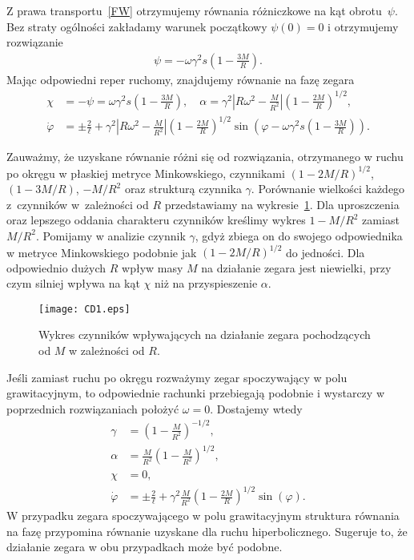 Z prawa transportu~\eqref{FW} otrzymujemy równania różniczkowe 
na kąt obrotu~$\psi$. Bez straty ogólności zakładamy warunek 
początkowy $\psi(0)=0$ i otrzymujemy rozwiązanie
\begin{align*}
\psi = - \omega \gamma^2 s \left( 1-\frac{3M}{R} \right).
\end{align*}
Mając odpowiedni reper ruchomy, znajdujemy równanie na 
fazę zegara
\begin{align}\nonumber
\chi &= - \psi =\omega \gamma^2 s \left( 1-\frac{3M}{R} \right)
 , \quad 
\alpha =  \gamma^2 
\left| R\omega^2 - \frac{M}{R^2} \right|
\left( 1-\frac{2M}{R} \right)^{1/2} ,
\\ \nonumber
\dot{\varphi} &= \pm \frac{2}{\ell} + 
\gamma^2 
\left| R\omega^2 - \frac{M}{R^2} \right|
\left( 1-\frac{2M}{R} \right)^{1/2}
\sin \left(\varphi - 
\omega \gamma^2 s \left( 1-\frac{3M}{R} \right)
 \right) .
\end{align}


Zauważmy, że uzyskane równanie różni się od rozwiązania,
otrzymanego w ruchu po okręgu w 
płaskiej metryce Minkowskiego, czynnikami
$\left( 1-2M/R \right)^{1/2}$,
$ \left( 1-3M/R \right)$, $-M/R^2$ oraz strukturą 
czynnika  $\gamma$. 
Porównanie wielkości każdego z~czynników
w~zależności od $R$ 
przedstawiamy na wykresie~\ref{CD1plot}.
Dla uproszczenia oraz lepszego oddania charakteru czynników 
kreślimy wykres $1-M/R^2$ zamiast $M/R^2$. Pomijamy w analizie 
czynnik $\gamma$,
 gdyż zbiega on do swojego odpowiednika w metryce Minkowskiego
podobnie jak $\left( 1-2M/R \right)^{1/2}$ do jedności.
Dla odpowiednio dużych $R$ wpływ masy $M$ na działanie zegara jest niewielki, 
przy czym silniej wpływa na kąt $\chi$ niż na przyspieszenie $\alpha$.  
\begin{figure}[h]
\centering
\texttt{[image: CD1.eps]}
\caption{Wykres czynników wpływających na działanie zegara 
pochodzących od $M$ w zależności od $R$.}{\label{CD1plot}}
\end{figure}
\newpage
Jeśli zamiast ruchu po okręgu rozważymy zegar spoczywający w 
polu grawitacyjnym, to odpowiednie rachunki przebiegają podobnie i 
wystarczy w poprzednich rozwiązaniach położyć $\omega=0$.
Dostajemy wtedy 
\begin{align*}
\gamma &= \left( 1 - \frac{M}{R^2} \right)^{-1/2},\\
\alpha &= \frac{M}{R^2} \left( 1 - \frac{M}{R^2} \right)^{1/2},\\
\chi &= 0,\\
\dot{\varphi} &= \pm \frac{2}{\ell} +
\gamma^2  \frac{M}{R^2} 
\left( 1-\frac{2M}{R} \right)^{1/2}
\sin \left(\varphi  \right).
\end{align*}
W przypadku zegara spoczywającego w polu grawitacyjnym 
struktura równania na fazę przypomina równanie uzyskane 
dla ruchu hiperbolicznego. Sugeruje to, że działanie 
zegara w obu przypadkach może być podobne.  
